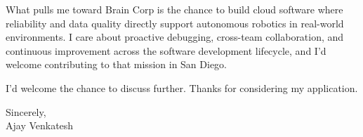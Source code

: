 \documentclass[letterpaper,11pt]{article}
\begin{document}
What pulls me toward Brain Corp is the chance to build cloud software where reliability and data quality directly support autonomous robotics in real-world environments. I care about proactive debugging, cross-team collaboration, and continuous improvement across the software development lifecycle, and I'd welcome contributing to that mission in San Diego.

I'd welcome the chance to discuss further. Thanks for considering my application.

\vspace{12pt}
Sincerely, \\
Ajay Venkatesh
\end{document}
